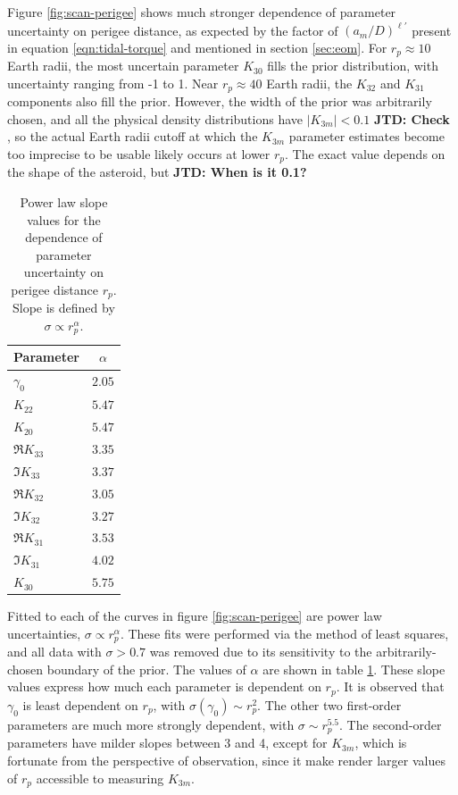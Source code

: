 \documentclass[fleqn,usenatbib]{mnras}
\newcommand{\jtd}[1]{ {\bf{\color{red} JTD: #1}} }
\begin{document}
Figure \ref{fig:scan-perigee} shows much stronger dependence of parameter uncertainty on perigee distance, as expected by the factor of $(a_m/D)^{\ell'}$ present in equation \ref{eqn:tidal-torque} and mentioned in section \ref{sec:eom}. For $r_p \approx 10$ Earth radii, the most uncertain parameter $K_{30}$ fills the prior distribution, with uncertainty ranging from -1 to 1. Near $r_p \approx 40$ Earth radii, the $K_{32}$ and $K_{31}$ components also fill the prior. However, the width of the prior was arbitrarily chosen, and all the physical density distributions have $|K_{3m}| < 0.1$ \jtd{Check}, so the actual Earth radii cutoff at which the $K_{3m}$ parameter estimates become too imprecise to be usable likely occurs at lower $r_p$. The exact value depends on the shape of the asteroid, but \jtd{When is it 0.1?}

\begin{table}
  \centering
  \begin{tabular}{l|c}
    \hline
    Parameter & $\alpha$ \\ \hline
    $\gamma_0$ & $2.05$ \\
    $K_{22}$ & $5.47$ \\
    $K_{20}$ & $5.47$ \\ \hline
    $\Re K_{33}$ & $3.35$ \\
    $\Im K_{33}$ & $3.37$ \\
    $\Re K_{32}$ & $3.05$ \\
    $\Im K_{32}$ & $3.27$ \\
    $\Re K_{31}$ & $3.53$ \\
    $\Im K_{31}$ & $4.02$ \\
    $K_{30}$ & $5.75$ \\ \hline
  \end{tabular}
  \caption{Power law slope values for the dependence of parameter uncertainty on perigee distance $r_p$. Slope is defined by $\sigma \propto r_p^\alpha$.}
  \label{tab:scan-perigee-alpha}
\end{table}

Fitted to each of the curves in figure \ref{fig:scan-perigee} are power law uncertainties, $\sigma \propto r_p^\alpha$. These fits were performed via the method of least squares, and all data with $\sigma > 0.7$ was removed due to its sensitivity to the arbitrarily-chosen boundary of the prior. The values of $\alpha$ are shown in table \ref{tab:scan-perigee-alpha}. These slope values express how much each parameter is dependent on $r_p$. It is observed that $\gamma_0$ is least dependent on $r_p$, with $\sigma(\gamma_0) \sim r_p^2$. The other two first-order parameters are much more strongly dependent, with $\sigma \sim r_p^{5.5}$. The second-order parameters have milder slopes between 3 and 4, except for $K_{3m}$, which is fortunate from the perspective of observation, since it make render larger values of $r_p$ accessible to measuring $K_{3m}$.
\end{document}
